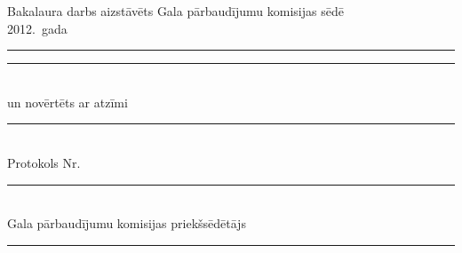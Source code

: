 \vspace*{2cm}\raggedright
\thispagestyle{empty}
Bakalaura darbs aizstāvēts Gala pārbaudījumu komisijas sēdē\\[1cm]
2012.~gada \textcolor{gray}{\rule[-2pt]{3em}{1pt}\hspace{1ex}\rule[-2pt]{10em}{1pt}}\\[1em]
un novērtēts ar atzīmi \textcolor{gray}{\rule[-2pt]{10em}{1pt}}\\[1em]

\vspace{2cm}
\noindent Protokols Nr. \textcolor{gray}{\rule[-2pt]{3em}{1pt}}\\[1cm]

\noindent
Gala pārbaudījumu komisijas priekšsēdētājs\\[1cm]
\textcolor{gray}{\rule[-2pt]{20em}{1pt}}\\[-1ex]

